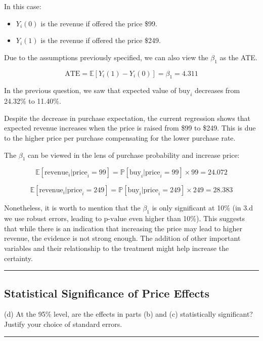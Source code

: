 \documentclass{article}
\newenvironment{colorparagraph}[1]{\par\color{#1}}{\par}
\begin{document}
In this case:

\begin{itemize}
    \item $Y_i(0)$ is the revenue if offered the price \$99.
    \item $Y_i(1)$ is the revenue if offered the price \$249.
\end{itemize}

Due to the assumptions previously specified, we can also view the $\beta_1$ as the ATE.

$$
\text{ATE} = \mathbb{E}[Y_i(1) - Y_i(0)] = \beta_1 = 4.311
$$

In the previous question, we saw that expected value of $\text{buy}_i$ decreases from 24.32\% to 11.40\%. 

Despite the decrease in purchase expectation, the current regression shows that expected revenue increases when the price is raised from \$99 to \$249. This is due to the higher price per purchase compensating for the lower purchase rate.

The $\beta_1$ can be viewed in the lens of purchase probability and increase price:

$$
\mathbb{E}[\text{revenue}_i | \text{price}_i = 99] = \mathbb{P}[\text{buy}_i | \text{price}_i = 99] \times 99 = 24.072
$$

$$
\mathbb{E}[\text{revenue}_i | \text{price}_i = 249] = \mathbb{P}[\text{buy}_i | \text{price}_i = 249] \times 249 = 28.383
$$

Nonetheless, it is worth to mention that the $\beta_1$ is only significant at 10\% (in 3.d we use robust errors, leading to $\text{p-value}$ even higher than 10\%).
This suggests that while there is an indication that increasing the price may lead to higher revenue, the evidence is not strong enough. The addition of other important variables and their relationship to the treatment might help increase the certainty.

\begin{colorparagraph}{questioncolor}
\rule{\textwidth}{0.5pt}

\label{q3d}\subsection{Statistical Significance of Price Effects}
(d) At the 95\% level, are the effects in parts (b) and (c) statistically significant? Justify your choice of standard errors.

\rule{\textwidth}{0.5pt}
\end{colorparagraph}
\end{document}
